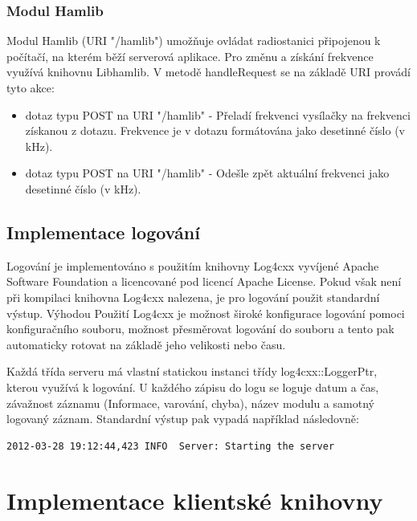 \subsubsection{Modul Hamlib}

Modul Hamlib (URI "/hamlib") umožňuje ovládat radiostanici připojenou k
počítačí, na kterém
běží serverová aplikace. Pro změnu a získání frekvence využívá knihovnu Libhamlib. 
V metodě handleRequest se na základě
URI provádí tyto akce:

\begin{itemize}
\item dotaz typu POST na URI "/hamlib" - Přeladí frekvenci vysílačky %
na frekvenci získanou z dotazu. Frekvence
je v dotazu formátována jako desetinné číslo (v kHz).
\item dotaz typu POST na URI "/hamlib" - Odešle zpět aktuální frekvenci jako
desetinné číslo (v kHz).
\end{itemize}

\subsection{Implementace logování}
\label{implementace_logovani}

Logování je implementováno s použitím knihovny Log4cxx vyvíjené Apache Software Foundation a licencované pod licencí
Apache License.  %
Pokud však není při kompilaci knihovna Log4cxx nalezena, je pro logování použit standardní výstup.
Výhodou Použití Log4cxx je možnost široké konfigurace logování pomoci konfiguračního souboru, možnost přesměrovat
logování do souboru a tento pak automaticky rotovat na základě jeho velikosti nebo času.

Každá třída serveru má vlastní statickou instanci třídy log4cxx::LoggerPtr, kterou využívá k logování.
U každého zápisu do logu se loguje datum a čas, závažnost záznamu (Informace, varování, chyba), název modulu a samotný
logovaný záznam. Standardní výstup pak vypadá například následovně:

\begin{verbatim}
2012-03-28 19:12:44,423 INFO  Server: Starting the server
\end{verbatim}

\section{Implementace klientské knihovny}
\label{implementace_knihovna}

